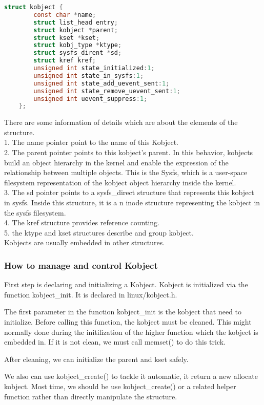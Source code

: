 \documentclass[10pt,draftclsnofoot,peerreview ,letterpaper,onecolumn,]{IEEEtran}
\begin{document}
	\begin{lstlisting}[language=C]
	struct kobject {
		const char *name;
		struct list_head entry;
		struct kobject *parent;
		struct kset *kset;
		struct kobj_type *ktype;
		struct sysfs_dirent *sd;
		struct kref kref;
		unsigned int state_initialized:1;
		unsigned int state_in_sysfs:1;
		unsigned int state_add_uevent_sent:1;
		unsigned int state_remove_uevent_sent:1;
		unsigned int uevent_suppress:1;
	};
	\end{lstlisting}
	There are some information of details which are about the elements of the structure.\\
	
		1. The name pointer point to the name of this Kobject. \\
		2. The parent pointer points to this kobject's parent. In this behavior, kobjects build an object hierarchy in the kernel and enable the expression of the relationship between multiple objects. This is the Sysfs, which is a user-space filesystem  representation of the kobject object hierarchy inside the kernel.\\
		3. The sd pointer points to a sysfs\_direct structure that represents this kobject in sysfs. Inside this structure, it is a n inode structure representing the kobject in the sysfs filesystem.\\
		4. The kref structure provides reference counting.\\
		5. the ktype and kset structures describe and group kobject.\\
	
	Kobjects are usually embedded in other structures.\\
	
	\subsubsection{How to manage and control Kobject}
	First step is declaring and initializing a Kobject. Kobject is initialized via the function kobject\_init. It is declared in linux/kobject.h. \par The first parameter in the function kobject\_init is the kobject that need to initialize. Before calling this function, the kobject must be cleaned. This might normally done during the initilization of the higher function which the kobject is embedded in. If it is not clean, we must call memset() to do this trick. \par After cleaning, we can initialize the parent and kset safely. \par We also can use kobject\_create() to tackle it automatic, it return a new allocate kobject. Most time, we should be use kobject\_create() or a related helper function rather than directly manipulate the structure.
\end{document}
